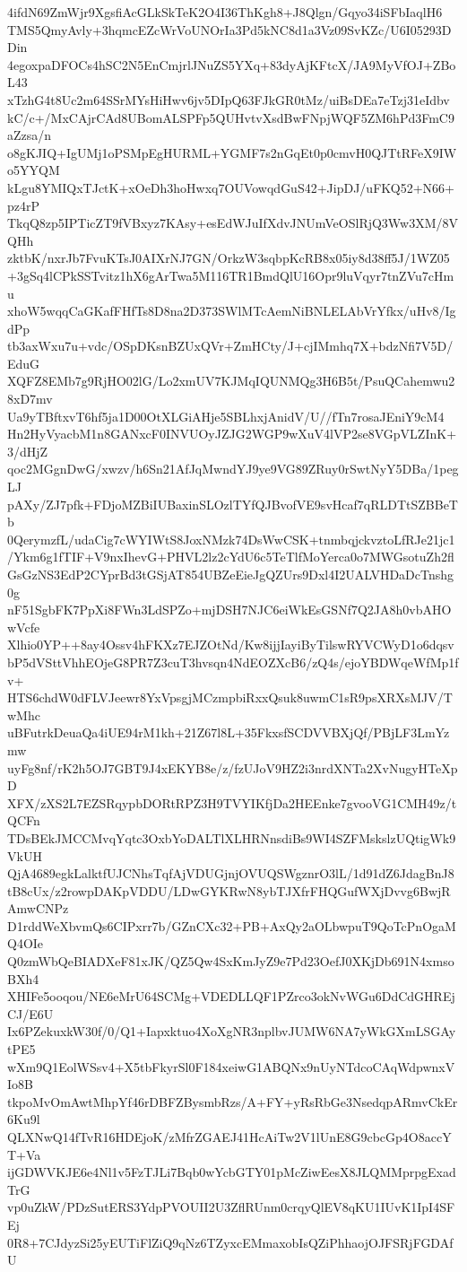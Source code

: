 4ifdN69ZmWjr9XgsfiAcGLkSkTeK2O4I36ThKgh8+J8Qlgn/Gqyo34iSFbIaqlH6
TMS5QmyAvly+3hqmcEZcWrVoUNOrIa3Pd5kNC8d1a3Vz09SvKZc/U6I05293DDin
4egoxpaDFOCs4hSC2N5EnCmjrlJNuZS5YXq+83dyAjKFtcX/JA9MyVfOJ+ZBoL43
xTzhG4t8Uc2m64SSrMYsHiHwv6jv5DIpQ63FJkGR0tMz/uiBsDEa7eTzj31eIdbv
kC/c+/MxCAjrCAd8UBomALSPFp5QUHvtvXsdBwFNpjWQF5ZM6hPd3FmC9aZzsa/n
o8gKJIQ+IgUMj1oPSMpEgHURML+YGMF7s2nGqEt0p0cmvH0QJTtRFeX9IWo5YYQM
kLgu8YMIQxTJctK+xOeDh3hoHwxq7OUVowqdGuS42+JipDJ/uFKQ52+N66+pz4rP
TkqQ8zp5IPTicZT9fVBxyz7KAsy+esEdWJuIfXdvJNUmVeOSlRjQ3Ww3XM/8VQHh
zktbK/nxrJb7FvuKTsJ0AIXrNJ7GN/OrkzW3sqbpKcRB8x05iy8d38ff5J/1WZ05
+3gSq4lCPkSSTvitz1hX6gArTwa5M116TR1BmdQlU16Opr9luVqyr7tnZVu7cHmu
xhoW5wqqCaGKafFHfTs8D8na2D373SWlMTcAemNiBNLELAbVrYfkx/uHv8/IgdPp
tb3axWxu7u+vdc/OSpDKsnBZUxQVr+ZmHCty/J+cjIMmhq7X+bdzNfi7V5D/EduG
XQFZ8EMb7g9RjHO02lG/Lo2xmUV7KJMqIQUNMQg3H6B5t/PsuQCahemwu28xD7mv
Ua9yTBftxvT6hf5ja1D00OtXLGiAHje5SBLhxjAnidV/U//fTn7rosaJEniY9cM4
Hn2HyVyacbM1n8GANxcF0INVUOyJZJG2WGP9wXuV4lVP2se8VGpVLZInK+3/dHjZ
qoc2MGgnDwG/xwzv/h6Sn21AfJqMwndYJ9ye9VG89ZRuy0rSwtNyY5DBa/1pegLJ
pAXy/ZJ7pfk+FDjoMZBiIUBaxinSLOzlTYfQJBvofVE9svHcaf7qRLDTtSZBBeTb
0QerymzfL/udaCig7cWYIWtS8JoxNMzk74DsWwCSK+tnmbqjckvztoLfRJe21jc1
/Ykm6g1fTIF+V9nxIhevG+PHVL2lz2cYdU6c5TeTlfMoYerca0o7MWGsotuZh2fl
GsGzNS3EdP2CYprBd3tGSjAT854UBZeEieJgQZUrs9Dxl4I2UALVHDaDcTnshg0g
nF51SgbFK7PpXi8FWn3LdSPZo+mjDSH7NJC6eiWkEsGSNf7Q2JA8h0vbAHOwVcfe
Xlhio0YP++8ay4Ossv4hFKXz7EJZOtNd/Kw8ijjIayiByTilswRYVCWyD1o6dqsv
bP5dVSttVhhEOjeG8PR7Z3cuT3hvsqn4NdEOZXcB6/zQ4s/ejoYBDWqeWfMp1fv+
HTS6chdW0dFLVJeewr8YxVpsgjMCzmpbiRxxQsuk8uwmC1sR9psXRXsMJV/TwMhc
uBFutrkDeuaQa4iUE94rM1kh+21Z67l8L+35FkxsfSCDVVBXjQf/PBjLF3LmYzmw
uyFg8nf/rK2h5OJ7GBT9J4xEKYB8e/z/fzUJoV9HZ2i3nrdXNTa2XvNugyHTeXpD
XFX/zXS2L7EZSRqypbDORtRPZ3H9TVYIKfjDa2HEEnke7gvooVG1CMH49z/tQCFn
TDsBEkJMCCMvqYqtc3OxbYoDALTlXLHRNnsdiBs9WI4SZFMskslzUQtigWk9VkUH
QjA4689egkLalktfUJCNhsTqfAjVDUGjnjOVUQSWgznrO3lL/1d91dZ6JdagBnJ8
tB8cUx/z2rowpDAKpVDDU/LDwGYKRwN8ybTJXfrFHQGufWXjDvvg6BwjRAmwCNPz
D1rddWeXbvmQs6CIPxrr7b/GZnCXc32+PB+AxQy2aOLbwpuT9QoTcPnOgaMQ4OIe
Q0zmWbQeBIADXeF81xJK/QZ5Qw4SxKmJyZ9e7Pd23OefJ0XKjDb691N4xmsoBXh4
XHIFe5ooqou/NE6eMrU64SCMg+VDEDLLQF1PZrco3okNvWGu6DdCdGHREjCJ/E6U
Ix6PZekuxkW30f/0/Q1+Iapxktuo4XoXgNR3nplbvJUMW6NA7yWkGXmLSGAytPE5
wXm9Q1EolWSsv4+X5tbFkyrSl0F184xeiwG1ABQNx9nUyNTdcoCAqWdpwnxVIo8B
tkpoMvOmAwtMhpYf46rDBFZBysmbRzs/A+FY+yRsRbGe3NsedqpARmvCkEr6Ku9l
QLXNwQ14fTvR16HDEjoK/zMfrZGAEJ41HcAiTw2V1lUnE8G9cbcGp4O8accYT+Va
ijGDWVKJE6e4Nl1v5FzTJLi7Bqb0wYcbGTY01pMcZiwEesX8JLQMMprpgExadTrG
vp0uZkW/PDzSutERS3YdpPVOUII2U3ZflRUnm0crqyQlEV8qKU1IUvK1IpI4SFEj
0R8+7CJdyzSi25yEUTiFlZiQ9qNz6TZyxcEMmaxobIsQZiPhhaojOJFSRjFGDAfU
